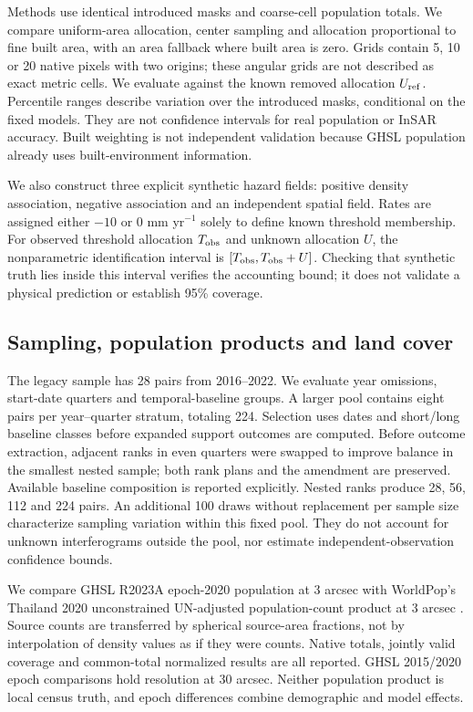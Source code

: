 \documentclass[pdflatex,sn-nature]{sn-jnl}
\begin{document}
Methods use identical introduced masks and coarse-cell population totals. We compare uniform-area allocation, center sampling and allocation proportional to fine built area, with an area fallback where built area is zero. Grids contain 5, 10 or 20 native pixels with two origins; these angular grids are not described as exact metric cells. We evaluate against the known removed allocation $U_{\rm ref}$. Percentile ranges describe variation over the introduced masks, conditional on the fixed models. They are not confidence intervals for real population or InSAR accuracy. Built weighting is not independent validation because GHSL population already uses built-environment information.

We also construct three explicit synthetic hazard fields: positive density association, negative association and an independent spatial field. Rates are assigned either $-10$ or $0$ mm yr$^{-1}$ solely to define known threshold membership. For observed threshold allocation $T_{\rm obs}$ and unknown allocation $U$, the nonparametric identification interval is $[T_{\rm obs},T_{\rm obs}+U]$. Checking that synthetic truth lies inside this interval verifies the accounting bound; it does not validate a physical prediction or establish 95\% coverage.

\subsection{Sampling, population products and land cover}
The legacy sample has 28 pairs from 2016--2022. We evaluate year omissions, start-date quarters and temporal-baseline groups. A larger pool contains eight pairs per year--quarter stratum, totaling 224. Selection uses dates and short/long baseline classes before expanded support outcomes are computed. Before outcome extraction, adjacent ranks in even quarters were swapped to improve balance in the smallest nested sample; both rank plans and the amendment are preserved. Available baseline composition is reported explicitly. Nested ranks produce 28, 56, 112 and 224 pairs. An additional 100 draws without replacement per sample size characterize sampling variation within this fixed pool. They do not account for unknown interferograms outside the pool, nor estimate independent-observation confidence bounds.

We compare GHSL R2023A epoch-2020 population at 3 arcsec with WorldPop's Thailand 2020 unconstrained UN-adjusted population-count product at 3 arcsec \citep{pesaresi2024ghsl,worldpop2020}. Source counts are transferred by spherical source-area fractions, not by interpolation of density values as if they were counts. Native totals, jointly valid coverage and common-total normalized results are all reported. GHSL 2015/2020 epoch comparisons hold resolution at 30 arcsec. Neither population product is local census truth, and epoch differences combine demographic and model effects.
\end{document}
